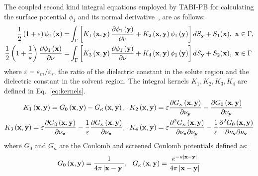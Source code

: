 \documentclass[12pt,titlepage]{article}
\begin{document}
The coupled second kind integral equations employed by TABI-PB for calculating the surface potential $\phi_1$ and its normal derivative~\cite{Juffer1991}, are as follows: 
%
\begin{equation}\label{eq:integraleq}
\begin{split}
\frac{1}{2}\left(1+\varepsilon\right)\phi_1\left({\bf x}\right) =& \int_\Gamma\left[K_1\left({\bf x}, {\bf y}\right) \frac{\partial \phi_1\left({\bf y}\right)}{\partial \nu} + K_2\left({\bf x}, {\bf y}\right) \phi_1\left({\bf y}\right) \right]dS_{\bf y} + S_1({\bf x}), \ {\bf x} \in \Gamma, \\ %
\frac{1}{2}\left(1+\frac{1}{\varepsilon}\right) \frac{\partial \phi_1\left({\bf x}\right)}{\partial \nu} =& \int_\Gamma\left[K_3\left({\bf x}, {\bf y}\right) \frac{\partial \phi_1\left({\bf y}\right)}{\partial \nu} + K_4\left({\bf x}, {\bf y}\right) \phi_1\left({\bf y}\right) \right]dS_{\bf y} + S_2({\bf x}), \ {\bf x} \in \Gamma 
\end{split} \end{equation} 
%
where $\varepsilon = \varepsilon_m / \varepsilon_s$, the ratio of the dielectric constant in the solute region and the dielectric constant in the solvent region. The integral kernels $K_1, K_2, K_3, K_4$ are defined in Eq.~\ref{eq:kernels}.
%
\begin{equation}
\begin{split}
K_1\left({\bf x}, {\bf y}\right) = G_0\left({\bf x}, {\bf y}\right) - G_\kappa\left({\bf x}, {\bf y}\right),& \ \ K_2\left({\bf x}, {\bf y}\right) = \varepsilon \frac{\partial G_\kappa\left({\bf x}, {\bf y}\right)}{\partial \nu_{\bf y}}
-\frac{\partial G_0\left({\bf x}, {\bf y}\right)}{\partial \nu_{\bf y}} \\ K_3\left({\bf x}, {\bf y}\right) = \varepsilon \frac{\partial G_0\left({\bf x}, {\bf y}\right)}{\partial \nu_{\bf x}}
-\frac{1}{\varepsilon}\frac{\partial G_\kappa\left({\bf x}, {\bf y}\right)}{\partial \nu_{\bf x}},& \ \ K_4\left({\bf x}, {\bf y}\right) = \varepsilon \frac{\partial^2 G_\kappa\left({\bf x}, {\bf y}\right)}{\partial \nu_{\bf x} \partial \nu_{\bf y}}
-\frac{1}{\varepsilon}\frac{\partial^2 G_0\left({\bf x}, {\bf y}\right)}{\partial \nu_{\bf x} \partial \nu_{\bf x}}
\label{eq:kernels}
\end{split} \end{equation}
%
where $G_0$ and $G_\kappa$ are the Coulomb and screened Coulomb potentials defined as:
%
\begin{equation}
G_0\left({\bf x}, {\bf y}\right) = \frac{1}{4\pi \left|{\bf x} - {\bf y}\right|}, \ \ G_\kappa\left({\bf x}, {\bf y}\right) = \frac{e^{-\kappa\left|{\bf x} - {\bf y}\right|}}{4\pi \left|{\bf x} - {\bf y}\right|} 
\end{equation}
\end{document}
